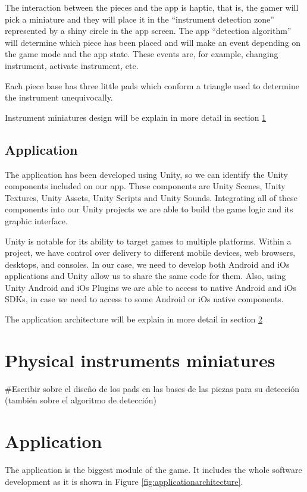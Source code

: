 The interaction between the pieces and the app is haptic, that is, the gamer will pick a miniature and they will place it in the “instrument detection zone” represented by a shiny circle in the app screen. The app “detection algorithm” will determine which piece has been placed and will make an event depending on the game mode and the app state. These events are, for example, changing instrument, activate instrument, etc.

Each piece base has three little pads which conform a triangle used to determine the instrument unequivocally.

Instrument miniatures design will be explain in more detail in section \ref{sec:instrumentminuatures}

\subsection{Application}
The application has been developed using Unity, so we can identify the Unity components included on our app. These components are Unity Scenes, Unity Textures, Unity Assets, Unity Scripts and Unity Sounds. Integrating all of these components into our Unity projects we are able to build the game logic and its graphic interface.

Unity is notable for its ability to target games to multiple platforms. Within a project, we have control over delivery to different mobile devices, web browsers, desktops, and consoles. In our case, we need to develop both Android and iOs applications and Unity allow us to share the same code for them. Also, using Unity Android and iOs Plugins we are able to access to native Android and iOs SDKs, in case we need to access to some Android or iOs native components.

The application architecture will be explain in more detail in section \ref{sec:application}

\FloatBarrier

\section{Physical instruments miniatures}
\label{sec:instrumentminuatures}
\#Escribir sobre el diseño de los pads en las bases de las piezas para su detección (también sobre el algoritmo de detección)

\FloatBarrier

\section{Application}
\label{sec:application}
The application is the biggest module of the game. It includes the whole software development as it is shown in Figure \ref{fig:applicationarchitecture}.

